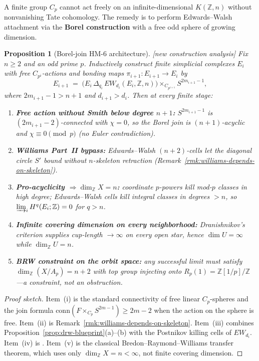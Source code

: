 \documentclass[11pt]{article}
\newtheorem{proposition}[theorem]{Proposition}
\theoremstyle{definition}
\newcommand{\status}[1]{\textit{\textcolor{black!70}{[#1]}}}
\begin{document}
A finite group $C_p$ cannot act freely on an infinite-dimensional
$K(\mathbb{Z},n)$ without nonvanishing Tate cohomology.  The remedy is to
perform Edwards--Walsh attachment via the \textbf{Borel construction} with a
free odd sphere of growing dimension.

\begin{proposition}[Borel-join HM-6 architecture]
\label{prop:borel-join-hm6}
\status{new construction analysis}
Fix $n\ge 2$ and an odd prime $p$.  Inductively construct finite simplicial
complexes $E_i$ with free $C_{p^i}$-actions and bonding maps
$\pi_{i+1}:E_{i+1}\to E_i$ by
\[
E_{i+1}
\;=\;
\bigl(E_i\,\Delta_{q_i}\,EW_{d_i}(E_i,\mathbb{Z},n)\bigr)
\times_{C_{p^{i+1}}}
S^{2m_{i+1}-1},
\]
where $2m_{i+1}-1>n+1$ and $d_{i+1}>d_i$.  Then at every finite stage:
\begin{enumerate}[label=(\roman*)]
\item \textbf{Free action without Smith below degree $n+1$:}
$S^{2m_{i+1}-1}$ is $(2m_{i+1}-2)$-connected with $\chi=0$, so the Borel join
is $(n+1)$-acyclic and $\chi\equiv 0\pmod{p}$ (no Euler contradiction).
\item \textbf{Williams Part~II bypass:}
Edwards--Walsh $(n+2)$-cells let the diagonal circle $S'$ bound without
$n$-skeleton retraction (Remark~\ref{rmk:williams-depends-on-skeleton}).
\item \textbf{Pro-acyclicity $\Rightarrow\dim_{\mathbb{Z}}X=n$:}
coordinate $p$-powers kill mod-$p$ classes in high degree; Edwards--Walsh
cells kill integral classes in degrees $>n$, so
$\varinjlim_i H^q(E_i;\mathbb{Z})=0$ for $q>n$.
\item \textbf{Infinite covering dimension on every neighborhood:}
Dranishnikov's criterion supplies cup-length $\to\infty$ on every open star,
hence $\dim U=\infty$ while $\dim_{\mathbb{Z}}U=n$.
\item \textbf{BRW constraint on the orbit space:}
any successful limit must satisfy
$\dim_{\mathbb{Z}}(X/A_p)=n+2$ with top group injecting onto
$R_p(1)=\mathbb{Z}[1/p]/\mathbb{Z}$
\cite{raymondwilliams1960,coppola1980}---a constraint, not an obstruction.
\end{enumerate}
\end{proposition}

\begin{proof}[Proof sketch]
Item~(i) is the standard connectivity of free linear $C_p$-spheres and the
join formula $\mathrm{conn}(F\times_{C_p}S^{2m-1})\ge 2m-2$ when the action on
the sphere is free.  Item~(ii) is Remark~\ref{rmk:williams-depends-on-skeleton}.
Item~(iii) combines Proposition~\ref{prop:drw-blueprint}(a)--(b) with the
Postnikov killing cells of $EW_{d_i}$.  Item~(iv) is
\cite[Prop.~3.3--3.4]{dranishnikov2016}.  Item~(v) is the classical
Bredon--Raymond--Williams transfer theorem, which uses only
$\dim_{\mathbb{Z}}X=n<\infty$, not finite covering dimension.
\end{proof}
\end{document}
